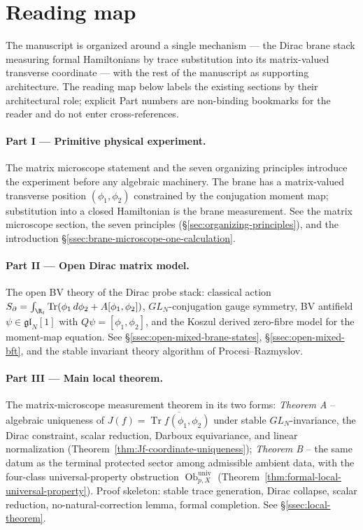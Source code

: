\section*{Reading map}\label{sec:reading-map}

The manuscript is organized around a single mechanism --- the Dirac
brane stack measuring formal Hamiltonians by trace substitution into
its matrix-valued transverse coordinate --- with the rest of the
manuscript as supporting architecture.  The reading map below labels
the existing sections by their architectural role; explicit Part
numbers are non-binding bookmarks for the reader and do not enter
cross-references.

\paragraph{Part I --- Primitive physical experiment.}  The matrix
microscope statement and the seven organizing principles introduce
the experiment before any algebraic machinery.  The brane has a
matrix-valued transverse position \((\phi_1,\phi_2)\) constrained by
the conjugation moment map; substitution into a closed Hamiltonian is
the brane measurement.  See the matrix microscope section, the seven
principles (\S\ref{sec:organizing-principles}), and the introduction
\S\ref{ssec:brane-microscope-one-calculation}.

\paragraph{Part II --- Open Dirac matrix model.}  The open BV theory
of the Dirac probe stack: classical action
\(S_\partial=\int_{\R_t}\operatorname{Tr}(\phi_1\,d\phi_2+A[\phi_1,\phi_2])\),
\(GL_N\)-conjugation gauge symmetry, BV antifield
\(\psi\in\mathfrak{gl}_N[1]\) with \(Q\psi=[\phi_1,\phi_2]\), and the
Koszul derived zero-fibre model for the moment-map equation.  See
\S\ref{ssec:open-mixed-brane-states},
\S\ref{ssec:open-mixed-bft}, and the stable invariant theory
algorithm of Procesi--Razmyslov.

\paragraph{Part III --- Main local theorem.}  The matrix-microscope
measurement theorem in its two forms: \emph{Theorem A} -- algebraic
uniqueness of \(J(f)=\overline{\operatorname{Tr}f(\phi_1,\phi_2)}\)
under stable \(GL_N\)-invariance, the Dirac constraint, scalar
reduction, Darboux equivariance, and linear normalization
(Theorem~\ref{thm:Jf-coordinate-uniqueness}); \emph{Theorem B} --
the same datum as the terminal protected sector among admissible
ambient data, with the four-class universal-property obstruction
\(\operatorname{Ob}^{\mathrm{univ}}_{p,X}\)
(Theorem~\ref{thm:formal-local-universal-property}).  Proof skeleton:
stable trace generation, Dirac collapse, scalar reduction,
no-natural-correction lemma, formal completion.  See
\S\ref{ssec:local-theorem}.

